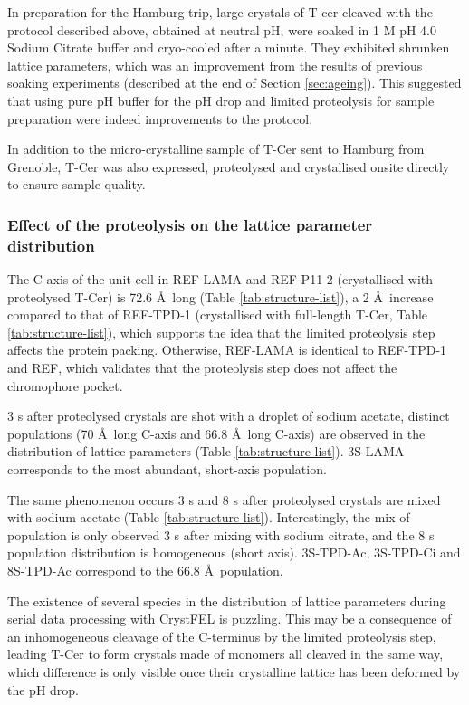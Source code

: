 In preparation for the Hamburg trip, large crystals of T-cer cleaved with the protocol described above, obtained at neutral pH, were soaked in 1 M pH 4.0 Sodium Citrate buffer and cryo-cooled after a minute. They exhibited shrunken lattice parameters, which was an improvement from the results of previous soaking experiments (described at the end of Section \ref{sec:ageing}). This suggested that using pure pH buffer for the pH drop and limited proteolysis for sample preparation were indeed improvements to the protocol.

In addition to the micro-crystalline sample of T-Cer sent to Hamburg from Grenoble, T-Cer was also expressed, proteolysed and crystallised onsite directly to ensure sample quality. 

\subsubsection{Effect of the proteolysis on the lattice parameter distribution}
The C-axis of the unit cell in REF-LAMA and REF-P11-2 (crystallised with proteolysed T-Cer) is 72.6 \AA\ long (Table \ref{tab:structure-list}), a 2 \AA\ increase compared to that of REF-TPD-1 (crystallised with full-length T-Cer, Table \ref{tab:structure-list}), which supports the idea that the limited proteolysis step affects the protein packing. Otherwise, REF-LAMA is identical to REF-TPD-1 and REF, which validates that the proteolysis step does not affect the chromophore pocket. 

3 s after proteolysed crystals are shot with a droplet of sodium acetate, distinct populations (70 \AA\ long C-axis and 66.8 \AA\ long C-axis) are observed in the distribution of lattice parameters (Table \ref{tab:structure-list}). 3S-LAMA corresponds to the most abundant, short-axis population. 

The same phenomenon occurs 3 s and 8 s after proteolysed crystals are mixed with sodium acetate (Table \ref{tab:structure-list}).  Interestingly, the mix of population is only observed 3 s after mixing with sodium citrate, and the 8 s population distribution is homogeneous (short axis). 3S-TPD-Ac, 3S-TPD-Ci and 8S-TPD-Ac correspond to the 66.8 \AA\ population.

The existence of several species in the distribution of lattice parameters during serial data processing with CrystFEL is puzzling. This may be a consequence of an inhomogeneous cleavage of the C-terminus by the limited proteolysis step, leading T-Cer to form crystals made of monomers all cleaved in the same way, which difference is only visible once their crystalline lattice has been deformed by the pH drop. 

